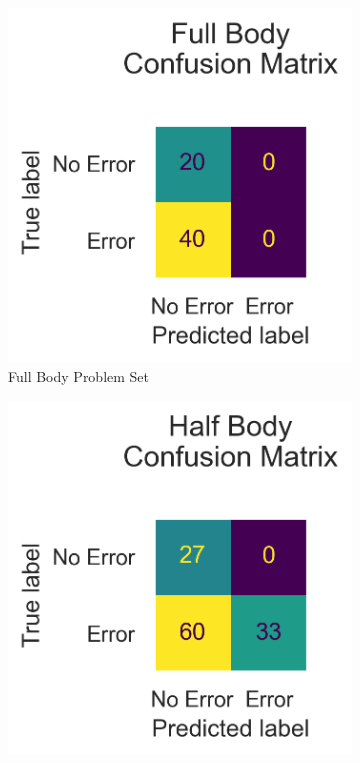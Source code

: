 \begin{figure}
  \centering
  \begin{subfigure}[b]{0.47\linewidth}
      \centering
      \includegraphics[width=\textwidth]{figures/Results/v2_bs_40_is_64_e_100/confusion/full_together.png}
      \caption[]{Full Body Problem Set}
      \label{fig:fb_conf}
  \end{subfigure}
  \hfill
  \begin{subfigure}[b]{0.47\linewidth}
      \centering
      \includegraphics[width=\textwidth]{figures/Results/v2_bs_40_is_64_e_100/confusion/half_together.png}

\end{subfigure}
\end{figure}
